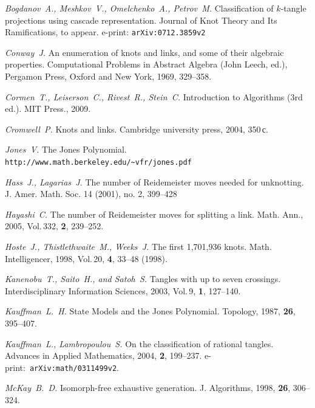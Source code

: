 \documentclass[12pt]{article}
\theoremstyle{plain}
\theoremstyle{definition}
\begin{document}
	\newpage
	\begin{thebibliography}{88}

		{\em Bogdanov~A., Meshkov~V., Omelchenko~A., Petrov~M.}
		Classification of $k$-tangle projections using cascade representation.
		Journal of Knot Theory and Its Ramifications, to appear.
		e-print: \texttt{arXiv:0712.3859v2}

		{\em Conway~J.}
		An enumeration of knots and links, and some of their algebraic properties.
		Computational Problems in Abstract Algebra (John Leech, ed.), Pergamon Press, Oxford
		and New York, 1969, 329--358.

		{\em Cormen~T., Leiserson~C., Rivest~R., Stein~C.}
		Introduction to Algorithms (3rd ed.).
		MIT Press., 2009.

		{\em Cromwell~P.}
		Knots and links.
		Cambridge university press, 2004, 350\,с.

		{\em Jones~V.}
		The Jones Polynomial.
		\texttt{http://www.math.berkeley.edu/\textasciitilde vfr/jones.pdf}

		{\em Hass~J., Lagarias~J.}
		The number of Reidemeister moves needed for unknotting.
		J. Amer. Math. Soc. 14 (2001), no. 2, 399--428

		{\em Hayashi~C.}
		The number of Reidemeister moves for splitting a link.
		Math. Ann., 2005, Vol.\,332, {\bf 2}, 239--252.

		{\em Hoste~J., Thistlethwaite~M., Weeks~J.}
		The first 1,701,936 knots.
		Math. Intelligencer, 1998, Vol.\,20, {\bf 4}, 33--48 (1998).

		{\em Kanenobu~T., Saito~H., and Satoh~S.}
		Tangles with up to seven crossings.
		Interdisciplinary Information Sciences, 2003, Vol.\,9, {\bf 1}, 127--140.

		{\em Kauffman~L.~H.}
		State Models and the Jones Polynomial.
		Topology, 1987, {\bf 26}, 395--407.

		{\em Kauffman~L., Lambropoulou~S.}
		On the classification of rational tangles.
		Advances in Applied Mathematics, 2004, {\bf 2}, 199--237.
		e-print:~\texttt{arXiv:math/0311499v2}.

		{\em McKay~B.~D.}
		Isomorph-free exhaustive generation.
		J. Algorithms, 1998, {\bf 26}, 306--324.


\end{thebibliography}
\end{document}
